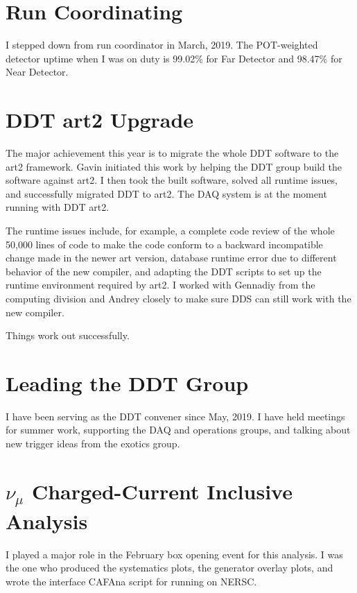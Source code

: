 \documentclass[]{report}   %
\begin{document}
\section*{Run Coordinating}
I stepped down from run coordinator in March, 2019. The POT-weighted detector uptime when I was on duty is 99.02\% for Far Detector and 98.47\% for Near Detector.

\section*{DDT art2 Upgrade}
The major achievement this year is to migrate the whole DDT software to the art2 framework. Gavin initiated this work by helping the DDT group build the software against art2. I then took the built software, solved all runtime issues, and successfully migrated DDT to art2. The DAQ system is at the moment running with DDT art2.

The runtime issues include, for example, a complete code review of the whole 50,000 lines of code to make the code conform to a backward incompatible change made in the newer art version, database runtime error due to different behavior of the new compiler, and adapting the DDT scripts to set up the runtime environment required by art2. I worked with Gennadiy from the computing division and Andrey closely to make sure DDS can still work with the new compiler.

Things work out successfully.

\section*{Leading the DDT Group}
I have been serving as the DDT convener since May, 2019. I have held meetings for summer work, supporting the DAQ and operations groups, and talking about new trigger ideas from the exotics group.

\section*{$\nu_\mu$ Charged-Current Inclusive Analysis}
I played a major role in the February box opening event for this analysis. I was the one who produced the systematics plots, the generator overlay plots, and wrote the interface CAFAna script for running on NERSC.
\end{document}
